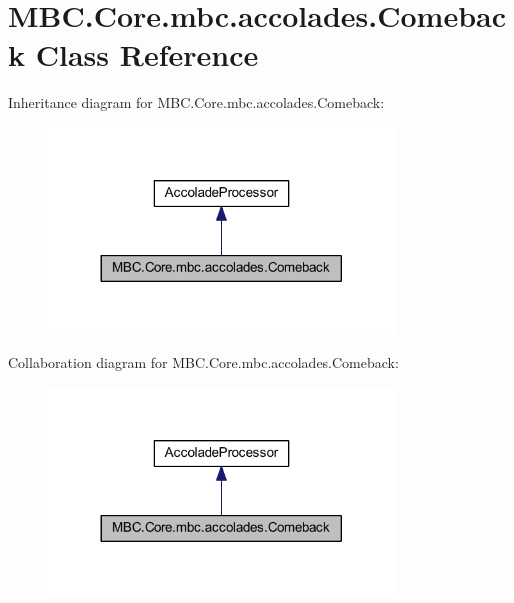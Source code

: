 \hypertarget{class_m_b_c_1_1_core_1_1mbc_1_1accolades_1_1_comeback}{\section{M\-B\-C.\-Core.\-mbc.\-accolades.\-Comeback Class Reference}
\label{class_m_b_c_1_1_core_1_1mbc_1_1accolades_1_1_comeback}
}


Inheritance diagram for M\-B\-C.\-Core.\-mbc.\-accolades.\-Comeback\-:\nopagebreak
\begin{figure}[H]
\begin{center}
\leavevmode
\includegraphics[width=260pt]{class_m_b_c_1_1_core_1_1mbc_1_1accolades_1_1_comeback__inherit__graph}
\end{center}
\end{figure}


Collaboration diagram for M\-B\-C.\-Core.\-mbc.\-accolades.\-Comeback\-:\nopagebreak
\begin{figure}[H]
\begin{center}
\leavevmode
\includegraphics[width=260pt]{class_m_b_c_1_1_core_1_1mbc_1_1accolades_1_1_comeback__coll__graph}
\end{center}
\end{figure}
